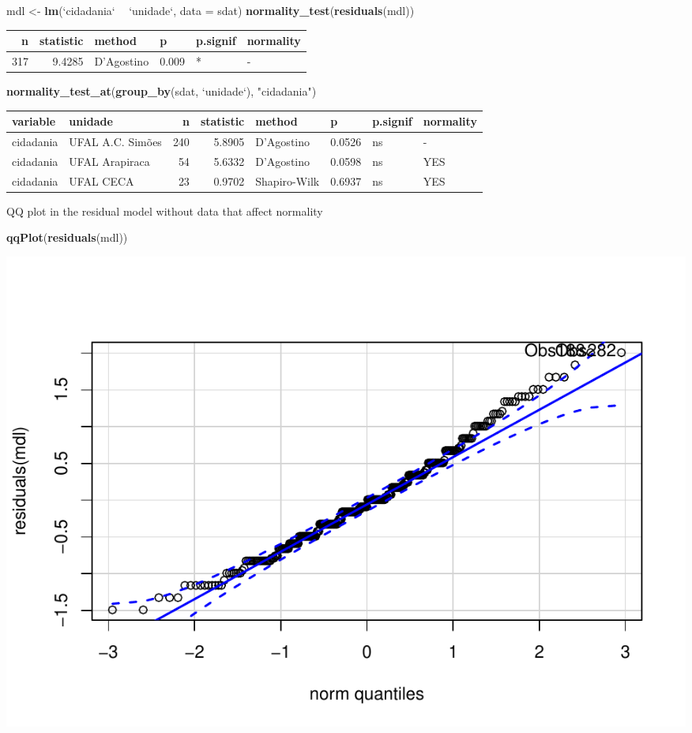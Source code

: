 \documentclass[]{article}
\newenvironment{Shaded}{\begin{snugshade}}{\end{snugshade}}
\newcommand{\DataTypeTok}[1]{\textcolor[rgb]{0.13,0.29,0.53}{#1}}
\newcommand{\KeywordTok}[1]{\textcolor[rgb]{0.13,0.29,0.53}{\textbf{#1}}}
\newcommand{\NormalTok}[1]{#1}
\newcommand{\OperatorTok}[1]{\textcolor[rgb]{0.81,0.36,0.00}{\textbf{#1}}}
\newcommand{\StringTok}[1]{\textcolor[rgb]{0.31,0.60,0.02}{#1}}
\begin{document}
\begin{Shaded}
\begin{Highlighting}[]
\NormalTok{mdl <-}\StringTok{ }\KeywordTok{lm}\NormalTok{(}\StringTok{`}\DataTypeTok{cidadania}\StringTok{`} \OperatorTok{~}\StringTok{ `}\DataTypeTok{unidade}\StringTok{`}\NormalTok{, }\DataTypeTok{data =}\NormalTok{ sdat)}
\KeywordTok{normality_test}\NormalTok{(}\KeywordTok{residuals}\NormalTok{(mdl))}
\end{Highlighting}
\end{Shaded}

\begin{longtable}[]{@{}rrllll@{}}
\toprule
n & statistic & method & p & p.signif & normality\tabularnewline
\midrule
\endhead
317 & 9.4285 & D'Agostino & 0.009 & * & -\tabularnewline
\bottomrule
\end{longtable}

\begin{Shaded}
\begin{Highlighting}[]
\KeywordTok{normality_test_at}\NormalTok{(}\KeywordTok{group_by}\NormalTok{(sdat, }\StringTok{`}\DataTypeTok{unidade}\StringTok{`}\NormalTok{), }\StringTok{"cidadania"}\NormalTok{)}
\end{Highlighting}
\end{Shaded}

\begin{longtable}[]{@{}llrrllll@{}}
\toprule
variable & unidade & n & statistic & method & p & p.signif &
normality\tabularnewline
\midrule
\endhead
cidadania & UFAL A.C. Simões & 240 & 5.8905 & D'Agostino & 0.0526 & ns &
-\tabularnewline
cidadania & UFAL Arapiraca & 54 & 5.6332 & D'Agostino & 0.0598 & ns &
YES\tabularnewline
cidadania & UFAL CECA & 23 & 0.9702 & Shapiro-Wilk & 0.6937 & ns &
YES\tabularnewline
\bottomrule
\end{longtable}

QQ plot in the residual model without data that affect normality

\begin{Shaded}
\begin{Highlighting}[]
\KeywordTok{qqPlot}\NormalTok{(}\KeywordTok{residuals}\NormalTok{(mdl))}
\end{Highlighting}
\end{Shaded}

\includegraphics{factorialAnova_files/figure-latex/unnamed-chunk-16-1.pdf}
\end{document}
